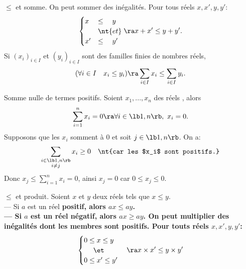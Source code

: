 \documentclass[11pt]{article}
\begin{document}
\begin{rappel}{$\leq$ et somme.}{}
    On peut sommer des inégalités. Pour tous réels $x,x',y,y'$:
    \begin{equation*}
        \begin{cases}
            x &\leq \quad y\\
            &\nt{et}\\
            x' &\leq \quad y' 
        \end{cases} \ra x+x' \leq y+y'.
    \end{equation*}
    Si $(x_i)_{i\in I}$ et $(y_i)_{i\in I}$ sont des familles finies de nombres réels,
    \begin{equation*}
        (\forall i \in I \quad x_i \leq y_i) \ra \sum_{i\in I}x_i \leq \sum_{i\in I}y_i.
    \end{equation*}
\end{rappel}

\begin{prop}{Somme nulle de termes positifs.}{}
    Soient $x_1,...,x_n$ des réels , alors
    \begin{equation*}
        \sum_{i=1}^nx_i=0 \ra \forall i \in \lb 1,n \rb, ~ x_i=0.
    \end{equation*}
    \tcblower
    Supposons que les $x_i$ somment à 0 et soit $j\in\lb1,n\rb$. On a:
    \begin{equation*}
        \sum_{\substack{i\in\lb1,n\rb\\i\neq j}}x_i\geq 0 \quad \nt{car les $x_i$ sont positifs.}
    \end{equation*}
    Donc $x_j\leq\sum\limits_{i=1}^nx_i=0$, ainsi $x_j=0$ car $0\leq x_j \leq 0$.
\end{prop}

\begin{rappel}{$\leq$ et produit.}{}
    Soient $x$ et $y$ deux réels tels que $x\leq y$.\\
    --- Si $a$ est un réel \bf{positif}, alors $ax\leq ay$.\\
    --- Si $a$ est un réel \bf{négatif}, alors $ax\geq ay$.\n
    On peut multiplier des inégalités dont les membres sont \bf{positifs}. Pour touts réels $x,x',y,y'$:
    \begin{equation*}
        \begin{cases}
            0\leq x\leq y\\
            \quad~\et\\
            0\leq x'\leq y'
        \end{cases}\ra x\times x' \leq y\times y'
    \end{equation*}
\end{rappel}
\end{document}
